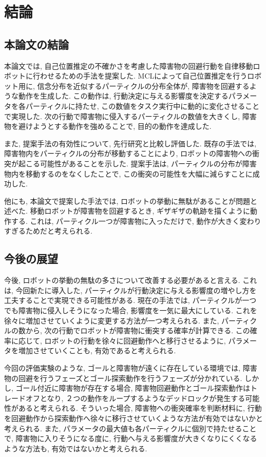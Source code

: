 \chapter{結論} \label{chapter:conclusion}

\section{本論文の結論}
本論文では, 自己位置推定の不確かさを考慮した障害物の回避行動を自律移動ロボットに行わせるための手法を提案した. 
MCLによって自己位置推定を行うロボット用に, 信念分布を近似するパーティクルの分布全体が, 障害物を回避するような動作を生成した. 
この動作は, 行動決定に与える影響度を決定するパラメータを各パーティクルに持たせ, この数値をタスク実行中に動的に変化させることで実現した. 
次の行動で障害物に侵入するパーティクルの数値を大きくし, 障害物を避けようとする動作を強めることで, 目的の動作を達成した. 

また, 提案手法の有効性について, 先行研究と比較し評価した. 
既存の手法では, 障害物内をパーティクルの分布が移動することにより, ロボットの障害物への衝突が起こる可能性があることを示した. 
提案手法は, パーティクルの分布が障害物内を移動するのをなくしたことで, この衝突の可能性を大幅に減らすことに成功した. 

他にも, 本論文で提案した手法では, ロボットの挙動に無駄があることが問題と述べた. 
移動ロボットが障害物を回避するとき, ギザギザの軌跡を描くように動作する. 
これは, パーティクル一つが障害物に入っただけで, 動作が大きく変わりすぎるためだと考えられる. 

\newpage

\section{今後の展望}
今後, ロボットの挙動の無駄の多さについて改善する必要があると言える. 
これは, 今回新たに導入した, パーティクルが行動決定に与える影響度の増やし方を工夫することで実現できる可能性がある. 
現在の手法では, パーティクルが一つでも障害物に侵入しそうになった場合, 影響度を一気に最大にしている. 
これを徐々に増加させていくように変更する方法が一つ考えられる. 
また, パーティクルの数から, 次の行動でロボットが障害物に衝突する確率が計算できる. 
この確率に応じて, ロボットの行動を徐々に回避動作へと移行させるように, パラメータを増加させていくことも, 有効であると考えられる. 

今回の評価実験のような, ゴールと障害物が遠くに存在している環境では, 
障害物の回避を行うフェーズとゴール探索動作を行うフェーズが分かれている. 
しかし, ゴール付近に障害物が存在する場合, 障害物回避動作とゴール探索動作はトレードオフとなり, 
２つの動作をループするようなデッドロックが発生する可能性があると考えられる. 
そういった場合, 障害物への衝突確率を判断材料に, 行動を回避動作から探索動作へ徐々に移行させていくような方法が有効ではないかと考えられる. 
また, パラメータの最大値も各パーティクルに個別で持たせることで, 
障害物に入りそうになる度に, 行動へ与える影響度が大きくなりにくくなるような方法も, 有効ではないかと考えられる. 
